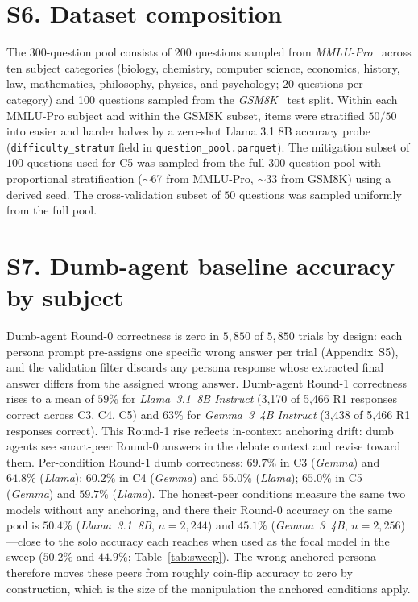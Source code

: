 \documentclass[11pt]{article}
\begin{document}
\section*{S6. Dataset composition}
\label{ssec:dataset}

The 300-question pool consists of 200 questions sampled from
\textit{MMLU-Pro}~\citep{wang2024mmlupro} across ten subject categories
(biology, chemistry, computer science, economics, history, law,
mathematics, philosophy, physics, and psychology; $20$ questions per
category) and 100 questions sampled from the
\textit{GSM8K}~\citep{cobbe2021training} test split.
Within each MMLU-Pro subject and within the GSM8K subset, items were
stratified $50/50$ into easier and harder halves by a zero-shot Llama
3.1 8B accuracy probe (\texttt{difficulty\_stratum} field in
\texttt{question\_pool.parquet}).
The mitigation subset of $100$ questions used for C5 was sampled from
the full $300$-question pool with proportional stratification
($\sim$67 from MMLU-Pro, $\sim$33 from GSM8K) using a derived seed.
The cross-validation subset of $50$ questions was sampled uniformly
from the full pool.

\section*{S7. Dumb-agent baseline accuracy by subject}
\label{ssec:dumbbaseline}

Dumb-agent Round-0 correctness is zero in $5{,}850$ of $5{,}850$
trials by design: each persona prompt pre-assigns one specific wrong
answer per trial (Appendix~S5), and the validation
filter discards any persona response whose extracted final answer
differs from the assigned wrong answer.
Dumb-agent Round-1 correctness rises to a mean of $59\%$ for
\textit{Llama~3.1~8B Instruct} (3{,}170 of 5{,}466 R1 responses
correct across C3, C4, C5) and $63\%$ for \textit{Gemma~3~4B Instruct}
(3{,}438 of 5{,}466 R1 responses correct).
This Round-1 rise reflects in-context anchoring drift: dumb agents
see smart-peer Round-0 answers in the debate context and revise
toward them.
Per-condition Round-1 dumb correctness: $69.7\%$ in C3
(\textit{Gemma}) and $64.8\%$ (\textit{Llama}); $60.2\%$ in C4
(\textit{Gemma}) and $55.0\%$ (\textit{Llama}); $65.0\%$ in C5
(\textit{Gemma}) and $59.7\%$ (\textit{Llama}).
The honest-peer conditions measure the same two models without any
anchoring, and there their Round-0 accuracy on the same pool is
$50.4\%$ (\textit{Llama~3.1~8B}, $n=2{,}244$) and $45.1\%$
(\textit{Gemma~3~4B}, $n=2{,}256$)---close to the solo accuracy each
reaches when used as the focal model in the sweep
($50.2\%$ and $44.9\%$; Table~\ref{tab:sweep}).
The wrong-anchored persona therefore moves these peers from roughly
coin-flip accuracy to zero by construction, which is the size of the
manipulation the anchored conditions apply.
\end{document}
